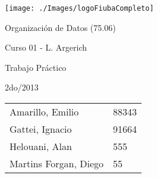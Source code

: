 \begin{titlepage}

\begin{flushleft}
\texttt{[image: ./Images/logoFiubaCompleto]}
\end{flushleft}

\begin{center}
\sffamily
\bfseries
\large

\vspace*{\fill}

Organización de Datos (75.06)


Curso 01 - L. Argerich

\vspace*{\fill}

Trabajo Práctico


2do/2013

\vspace*{\fill}

\begin{table}[!h]
\normalfont
\centering
\large

\begin{tabular}{l l}
\toprule
Amarillo, Emilio & 88343 \\
Gattei, Ignacio & 91664\\
Helouani, Alan & 555\\
Martins Forgan, Diego &55\\
\bottomrule
\end{tabular}
\end{table}

\vspace*{\fill}

\end{center}
\end{titlepage}